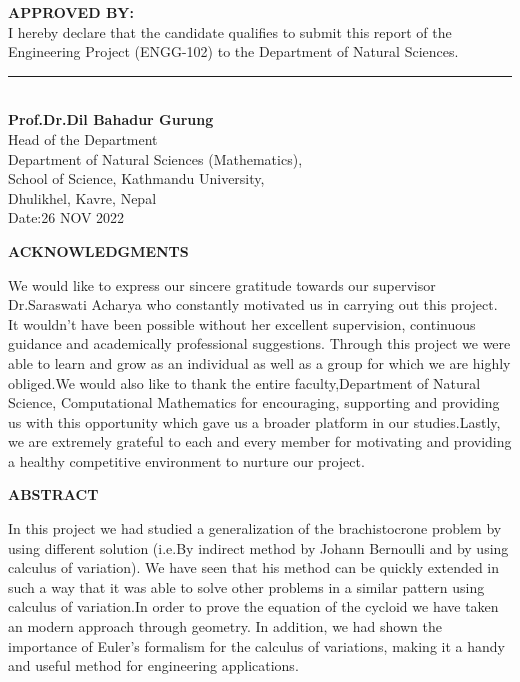 \documentclass[10pt,a4paper]{article}
\begin{document}
\newpage
\textbf{APPROVED BY:\\}
I hereby declare that the candidate qualifies to submit this report of the Engineering
Project (ENGG-102) to the Department of Natural Sciences. 
\vspace{3 cm}\\
\rule{4 cm}{0.2 pt}
\vspace{0.1 cm}
\textbf{\\ Prof.Dr.Dil Bahadur Gurung \\}
\vspace{0.1 cm}
Head of the Department \\
\vspace{0.1 cm}
Department of Natural Sciences (Mathematics),\\
\vspace{0.1 cm}
School of Science, Kathmandu University,\\
\vspace{0.1 cm}
Dhulikhel, Kavre, Nepal\\
\vspace{0.1 cm}
Date:26 NOV 2022

\newpage


\centering \textbf{ACKNOWLEDGMENTS\\}
\begin{flushleft}
	We would like to express our sincere gratitude towards our supervisor Dr.Saraswati
	Acharya who constantly motivated us in carrying out this project. It wouldn’t have
	been possible without her excellent supervision, continuous guidance and academically
	professional suggestions. Through this project we were able to learn and grow as an individual as well as a group for which we are highly obliged.We would also like to thank the entire faculty,Department of Natural Science, Computational Mathematics for encouraging, supporting and providing us with this opportunity which gave us a broader platform in our studies.Lastly, we are extremely grateful to each and every member for motivating and providing a healthy competitive environment to nurture our project.
\end{flushleft}

\newpage
\centering \textbf{ABSTRACT\\}
\begin{flushleft}
	In this project we had studied a generalization of the brachistocrone problem by using
	different solution (i.e.By indirect method by Johann Bernoulli and by using calculus of
	variation). We have seen that his method can be quickly extended in such a way that
	it was able to solve other problems in a similar pattern using calculus of variation.In
	order to prove the equation of the cycloid we have taken an modern approach through
	geometry. In addition, we had shown the importance of Euler’s formalism for the calculus
	of variations, making it a handy and useful method for engineering applications.
\end{flushleft}
\end{document}
